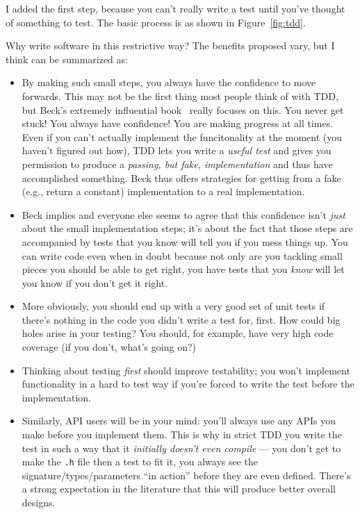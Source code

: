 \documentclass[sigplan,screen]{acmart}
\begin{document}
I added the first step, because you can't really write a test until
you've thought of something to test.  The basic process is as shown in Figure~\ref{fig:tdd}.


Why write software in this restrictive way?  The benefits proposed
vary, but I think can be summarized as:

\begin{itemize}
  \item By making such small steps, you always have the confidence to
    move forwards.  This may not be the first thing most people think
    of with TDD, but Beck's extremely influential book~\cite{beck2002test} really focuses
    on this.  You never get stuck!  You always have confidence!  You
    are making progress at all times.  Even if you can't actually
    implement the funcitonality at the moment (you haven't figured out
    how), TDD lets you write a \emph{useful test} and gives you
    permission to produce a \emph{passing,
      but fake, implementation} and thus have accomplished something.
    Beck thus offers strategies for getting from a fake (e.g., return a
    constant) implementation to a real implementation.
    \item Beck implies and everyone else seems to agree that this
      confidence isn't \emph{just} about the small implementation steps; it's about
      the fact that those steps are accompanied by tests that you know
      will tell you if you mess things up.  You can write code even
      when in doubt because not only are you tackling small pieces you
      should be able to get right, you have tests that you \emph{know}
      will let you know if you don't get it right.
      \item More obviously, you should end up with a very good set of unit
        tests if there's nothing in the code you didn't write a test
        for, first.  How could big holes arise in your testing?  You
        should, for example, have very high code coverage (if you
        don't, what's going on?)
        \item Thinking about testing \emph{first} should improve
          testability; you won't implement functionality in a hard to
          test way if you're forced to write the test before the
          implementation.
          \item Similarly, API users will be in your mind: you'll
            always use any APIs you make before you implement them.
            This is why in strict TDD you write the test in such a way
            that it \emph{initially doesn't even compile} --- you
            don't get to make the {\tt .h} file then a test to fit it,
            you always see the signature/types/parameters ``in action''
            before they are even defined.
            There's a strong expectation in the literature that this
            will produce better overall designs.
            \end{itemize}
\end{document}

